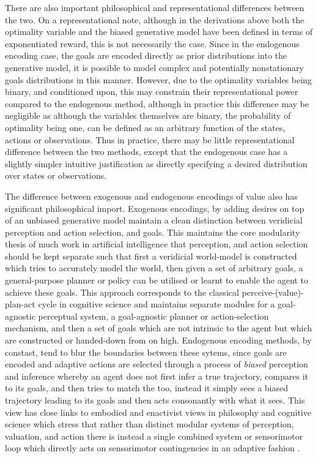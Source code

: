 There are also important philosophical and representational differences between the two. On a representational note, although in the derivations above both the optimality variable and the biased generative model have been defined in terms of exponentiated reward, this is not necessarily the case. Since in the endogenous encoding case, the goals are encoded directly as prior distributions into the generative model, it is possible to model complex and potentially nonstationary goals distributions in this manner. However, due to the optimality variables being binary, and conditioned upon, this may constrain their representational power compared to the endogenous method, although in practice this difference may be negligible as although the variables themselves are binary, the probability of optimality being one, can be defined as an arbitrary function of the states, actions or observations. Thus in practice, there may be little representational difference between the two methods, except that the endogenous case has a slightly simpler intuitive justification as directly specifying a desired distribution over states or observations.

The difference between exogenous and endogenous encodings of value also has significant philosophical import. Exogenous encodings, by adding desires on top of an unbiased generative model maintain a clean distinction between veridicial perception and action selection, and goals. This maintains the core modularity thesis of much work in artificial intelligence that perception, and action selection should be kept separate such that first a veridicial world-model is constructed which tries to accurately model the world, then given a set of arbitrary goals, a general-purpose planner or policy can be utilised or learnt to enable the agent to achieve these goals. This approach corresponds to the classical perceive-(value)-plan-act cycle in cognitive science and maintains separate modules for a goal-agnostic perceptual system, a goal-agnostic planner or action-selection mechanism, and then a set of goals which are not intrinsic to the agent but which are constructed or handed-down from on high. Endogenous encoding methods, by constast, tend to blur the boundaries between these sytems, since goals are encoded and adaptive actions are selected through a process of \emph{biased} perception and inference whereby an agent does not first infer a true trajectory, compares it to its goals, and then tries to match the too, instead it simply sees a biased trajectory leading to its goals and then acts consonantly with what it sees. This view has close links to embodied and enactivist views in philosophy and cognitive science which stress that rather than distinct modular systems of perception, valuation, and action there is instead a single combined system or sensorimotor loop which directly acts on sensorimotor contingencies in an adaptive fashion \citep{baltieri2018modularity}.


